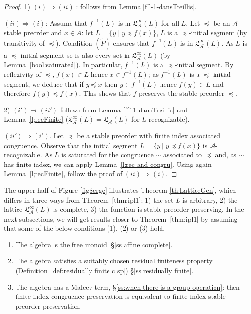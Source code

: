 \documentclass[11pt,a4paper]{article}
\theoremstyle{definition} %
\newcommand\+[1]{\mathcal{#1}} %
\newcommand{\Latt}{{\mathfrak{L}}}
\DeclareMathOperator{\freez}{Frz}%
\newcommand{\DUO}{{\freez}^*}
\newcommand{\gen}{\textit{gen}}
\begin{document}
\begin{proof}  
1)
$(i)\Longrightarrow (ii)$ :  follows from Lemma \ref{f^-1-dansTreillis}.%

$(ii)\Longrightarrow (i)$: 
 Assume that $f^{-1}(L)$ is in $\Latt_{\+A}^\infty(L)$ for all $L$.
Let $\preceq$ be an $\+A$-stable preorder and $x\in A$: let 
$L=\{y \mid y \preceq f(x)\}$, $L$ is a $\preceq$-initial segment (by transitivity of  $\preceq$).
Condition $(\widetilde{P})$ ensures that $f^{-1}(L)$ is in $\Latt_{\+A}^\infty(L)$.
As $L$ is a $\preceq$-initial segment so is also every set in $\Latt_{\+A}^\infty(L)$
(by Lemma~\ref{bool:saturated}). In particular,  $f^{-1}(L)$ is a $\preceq$-initial segment.
By reflexivity of $\preceq$, $f(x)\in L$ hence  $x\in f^{-1}(L)$; as $f^{-1}(L)$ is a $\preceq$-initial segment,  we deduce that if $y\preceq x$ then $y\in f^{-1}(L)$
hence $f(y)\in L$ and therefore $f(y)\preceq f(x)$.
This shows that $f$ preserves the stable preorder $\preceq$.


 2) $(i')\Longrightarrow (ii')$ follows from Lemma \ref{f^-1-dansTreillis}  and Lemma~\ref{l;recFinite}   ($\Latt_{\+A}^\infty(L)=\Latt_{\+A}(L)$ for $L$ recognizable).
 
$(ii')\Longrightarrow (i')$.
Let $\preceq$ be a stable preorder with finite index associated congruence.
Observe that the initial segment $L=\{y \mid y \preceq f(x)\}$ is $\+A$-recognizable.
As $L$ is saturated for the congruence $\sim$ associated to $\preceq$
and, as $\sim$ has finite index, we can apply Lemma~\ref{l:rec and congru}.
Using again Lemma~\ref{l;recFinite},  follow the proof of $(ii)\Longrightarrow (i)$.
\end{proof}
%
%
The upper half of Figure \ref{figSerge}    illustrates Theorem \ref{th:LatticeGen},
which  differs in three ways from  Theorem~\ref{thm:ipl1}:
1) the set $L$ is arbitrary,
2) the lattice  $\Latt_{\+A}^\infty(L)$ is complete,
3) the function is stable preorder preserving.
In the next subsections, we will get  results closer to  Theorem~\ref{thm:ipl1}  by assuming that some of the below conditions (1), (2) or (3) hold.
\begin{enumerate}\itemsep0em
 \item The algebra is the free monoid, \S\ref{ss affine complete}.
\item The algebra satisfies a suitably chosen residual finiteness property (Definition~\ref{def:residually finite c sp}) \S\ref{ss residually finite}.
\item The algebra has a Malcev term, \S\ref{ss:when there is a group operation}: then
 finite index congruence preservation is equivalent to finite index stable preorder preservation.
\end{enumerate}
%
\end{document}
